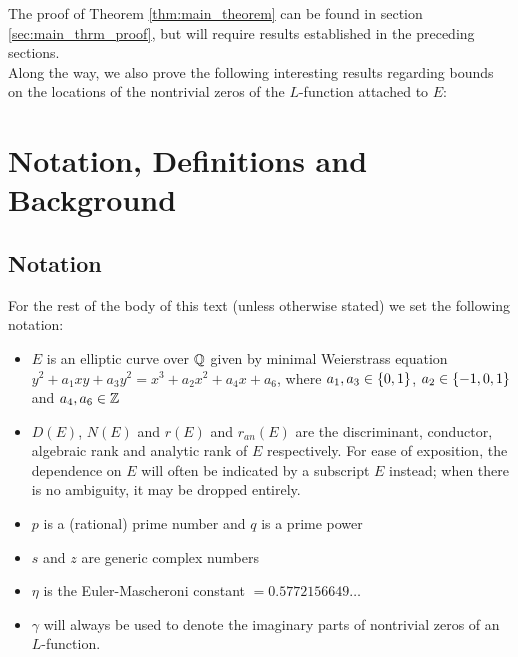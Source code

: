 \documentclass[10pt]{article}
\begin{document}
The proof of Theorem \ref{thm:main_theorem} can be found in section \ref{sec:main_thrm_proof}, but will require results established in the preceding sections. \\

Along the way, we also prove the following interesting results regarding bounds on the locations of the nontrivial zeros of the $L$-function attached to $E$:


\newpage
\section{Notation, Definitions and Background}\label{sec:defs_background}

\subsection{Notation}\label{subsec:notation}

For the rest of the body of this text (unless otherwise stated) we set the following notation:
\begin{itemize}
\item $E$ is an elliptic curve over $\mathbb{Q}$ given by minimal Weierstrass equation $y^2 + a_1 xy + a_3 y^2 = x^3 + a_2 x^2 + a_4 x + a_6$, where $a_1, a_3 \in \left\{0,1\right\}$, $a_2 \in \left\{-1,0,1\right\}$ and $a_4,a_6 \in \mathbb{Z}$
\item $D(E)$, $N(E)$ and $r(E)$  and $r_{an}(E)$ are the discriminant, conductor, algebraic rank and analytic rank of $E$ respectively. For ease of exposition, the dependence on $E$ will often be indicated by a subscript $E$ instead; when there is no ambiguity, it may be dropped entirely.
\item $p$ is a (rational) prime number and $q$ is a prime power
\item $s$ and $z$ are generic complex numbers
\item $\eta$ is the Euler-Mascheroni constant $= 0.5772156649\ldots$
\item $\gamma$ will always be used to denote the imaginary parts of nontrivial zeros of an $L$-function. \\
\end{itemize}
\end{document}
